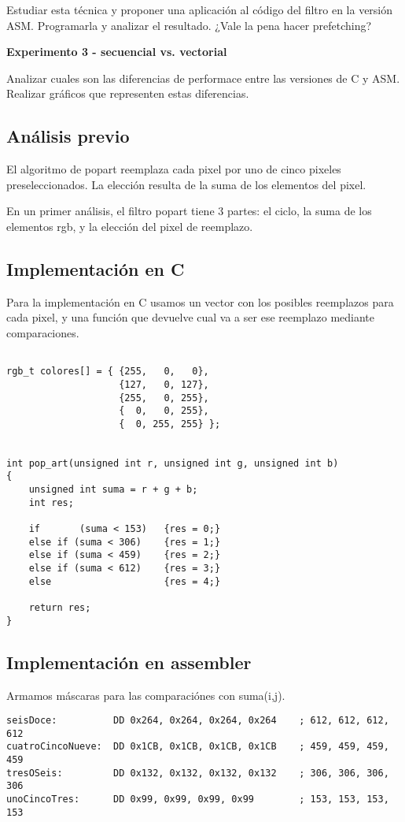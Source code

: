   \vspace*{0.2cm}
  Estudiar esta técnica y proponer una aplicación al código del filtro en la versión ASM.
  Programarla y analizar el resultado. ¿Vale la pena hacer prefetching?

\vspace*{0.3cm} \noindent
\textbf{Experimento 3 - secuencial vs. vectorial}

  Analizar cuales son las diferencias de performace entre las versiones de C y ASM. 
  Realizar gráficos que representen estas diferencias.


\subsection{An\'alisis previo}
El algoritmo de popart reemplaza cada pixel por uno de cinco pixeles preseleccionados. 
La elecci\'on resulta de la suma de los elementos del pixel.

En un primer an\'alisis, el filtro popart tiene 3 partes: el ciclo, la suma de los elementos rgb, y la elecci\'on del pixel de reemplazo.

\subsection{Implementaci\'on en C}
Para la implementaci\'on en C usamos un vector con los posibles reemplazos para cada pixel, 
y una funci\'on que devuelve cual va a ser ese reemplazo mediante comparaciones.
\begin{codesnippet}
\begin{verbatim}

rgb_t colores[] = { {255,   0,   0},
                    {127,   0, 127},
                    {255,   0, 255},
                    {  0,   0, 255},
                    {  0, 255, 255} };

			
int pop_art(unsigned int r, unsigned int g, unsigned int b)
{
    unsigned int suma = r + g + b;
    int res;
	
    if 		 (suma < 153)	{res = 0;}
    else if (suma < 306)	{res = 1;}
    else if (suma < 459)	{res = 2;}
    else if (suma < 612)	{res = 3;}
    else 					{res = 4;}
	
    return res;
}
\end{verbatim}
\end{codesnippet}

\subsection{Implementaci\'on en assembler}
Armamos máscaras para las comparaci\'ones con suma(i,j).
\begin{codesnippet}
\begin{verbatim}
seisDoce:          DD 0x264, 0x264, 0x264, 0x264    ; 612, 612, 612, 612			
cuatroCincoNueve:  DD 0x1CB, 0x1CB, 0x1CB, 0x1CB    ; 459, 459, 459, 459	
tresOSeis:         DD 0x132, 0x132, 0x132, 0x132    ; 306, 306, 306, 306	
unoCincoTres:      DD 0x99, 0x99, 0x99, 0x99        ; 153, 153, 153, 153
\end{verbatim}
\end{codesnippet}

